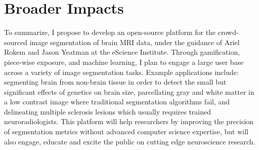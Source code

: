 \section{Broader Impacts}

To summarize, I propose to develop an open-source platform for the crowd-sourced image segmentation of brain MRI data, under the guidance of Ariel Rokem and Jason Yeatman at the eScience Institute. Through gamification, piece-wise exposure, and machine learning, I plan to engage a large user base across a variety of image segmentation tasks. Example applications include: segmenting brain from non-brain tissue in order to detect the small but significant effects of genetics on brain size, parcellating gray and white matter in a low contrast image where traditional segmentation algorithms fail, and delineating multiple sclerosis lesions which usually requires trained neuroradiologists. This platform will help researchers by improving the precision of segmentation metrics without advanced computer science expertise, but will also engage, educate and excite the public on cutting edge neuroscience research. 
